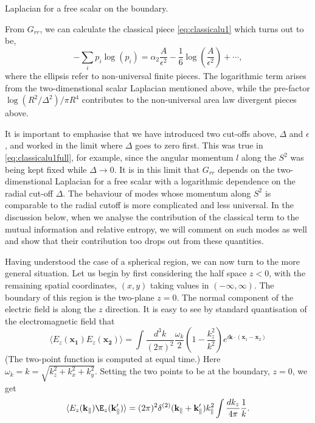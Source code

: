 Laplacian for a free scalar on the boundary. 
\par From $G_{rr}$, we can calculate the classical piece \eqref{eq:classicalu1}
which turns out to be,
\begin{equation}
  -\sum_i p_i\log(p_i) = \alpha_2\frac{A}{\epsilon^2}
  - \frac{1}{6}\log\left(\frac{A}{\epsilon^2}\right) + \cdots,
  \label{classicalu1full}
\end{equation}
where the ellipsis refer to non-universal finite pieces. The logarithmic term
arises from the two-dimenstional scalar Laplacian mentioned above, while
the pre-factor $\log(R^2/\Delta^2)/\pi R^4$ contributes to the non-universal
area law divergent pieces above.
\par It is important to emphasise that we have introduced two cut-offs above,
$\Delta$ and $\epsilon$, and worked in the limit where $\Delta$ goes to zero
first. This was true in \eqref{eq:classicalu1full}, for example, since the
angular momentum $l$ along the $S^2$ was being kept fixed while
$\Delta\rightarrow 0$. It is in this limit that $G_{rr}$ depends on the
two-dimenstional Laplacian for a free scalar with a logarithmic dependence on
the radial cut-off $\Delta$. The behaviour of modes whose momentum along $S^2$
is comparable to the radial cutoff is more complicated and less universal. In
the discussion below, when we analyse the contribution of the classical term to
the mutual information and relative entropy, we will comment on such modes as
well and show that their contribution too drops out from these quantities.
\par Having understood the case of a spherical region, we can now turn to the 
more general situation. Let us begin by first considering the half space $z<0$,
with the remaining spatial coordinates, $(x,y)$ taking values in
$(-\infty,\infty)$. The boundary of this region is the two-plane $z=0$. The
normal component of the electric field is along the $z$ direction. It is easy
to see by standard quantisation of the electromagnetic field that 
\begin{equation}
  \langle E_z(\mathbf{x_1})E_z(\mathbf{x_2})\rangle = \int
  \frac{d^3k}{(2\pi)^2}\frac{\omega_k}{2}\left(1-\frac{k_z^2}{k^2}\right)e^{i\mathbf{k}\cdot(\mathbf{x}_1
    - \mathbf{x}_2)}
\end{equation}
(The two-point function is computed at equal time.) Here $\omega_k
= k = \sqrt{k^2_z + k^2_x + k^2_y}$. Setting the two points to be at the
boundary, $z=0$, we get
\begin{equation}
  \langle E_z(\mathbf{k}_{\|})\E_z(\mathbf{k}_{\|}')\rangle
  = (2\pi)^2\delta^{(2)}(\mathbf{k}_{\|}
  + \mathbf{k}_{\|}')k^2_{\|}\int{\frac{dk_z}{4\pi}\frac{1}{k}}.
\end{equation}
